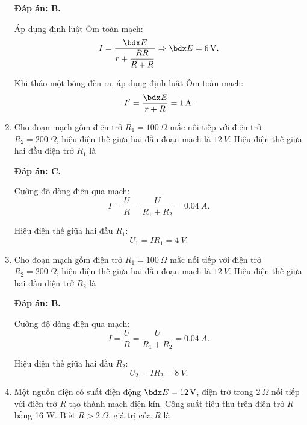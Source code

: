 \begin{enumerate}[label=\bfseries Câu \arabic*:]
{	}
	\loigiai
	{	\textbf{Đáp án: B.}
		
		Áp dụng định luật Ôm toàn mạch:
		$$I=\dfrac{\calE}{r + \dfrac{R R}{R + R}} \Rightarrow \calE = \SI{6}{V}.$$
		
		Khi tháo một bóng đèn ra, áp dụng định luật Ôm toàn mạch:
		$$I' = \dfrac{\calE}{r + R} = \SI{1}{A}.$$
	}
	\item {}
	
	\cauhoi
	{Cho đoạn mạch gồm điện trở $R_1=\SI{100}{\Omega}$ mắc nối tiếp với điện trở $R_2=\SI{200}{\Omega}$, hiệu điện thế giữa hai đầu đoạn mạch là $\SI{12}{V}$. Hiệu điện thế giữa hai đầu điện trở $R_1$ là
		
	}
	\loigiai
	{	\textbf{Đáp án: C.}
		
		Cường độ dòng điện qua mạch:
		$$I=\dfrac{U}{R} = \dfrac{U}{R_1 + R_2} = \SI{0.04}{A}.$$
		
		Hiệu điện thế giữa hai đầu $R_1$:
		$$U_1 = I R_1 = \SI{4}{V}.$$
	}
	\item {}
	
	\cauhoi
	{Cho đoạn mạch gồm điện trở $R_1=\SI{100}{\Omega}$ mắc nối tiếp với điện trở $R_2=\SI{200}{\Omega}$, hiệu điện thế giữa hai đầu đoạn mạch là $\SI{12}{V}$. Hiệu điện thế giữa hai đầu điện trở $R_2$ là
		
	}
	\loigiai
	{	\textbf{Đáp án: B.}
		
		Cường độ dòng điện qua mạch:
		$$I=\dfrac{U}{R} = \dfrac{U}{R_1 + R_2} = \SI{0.04}{A}.$$
		
		Hiệu điện thế giữa hai đầu $R_2$:
		$$U_2 = I R_2= \SI{8}{V}.$$
	}
	\item {}
	
	\cauhoi
	{Một nguồn điện có suất điện động $\calE = \SI{12}{V}$, điện trở trong $\SI{2}{\Omega}$ nối tiếp với điện trở $R$ tạo thành mạch điện kín. Công suất tiêu thụ trên điện trở $R$ bằng 16 W. Biết $R>\SI{2}{\Omega}$, giá trị của $R$ là
		
}
\end{enumerate}
